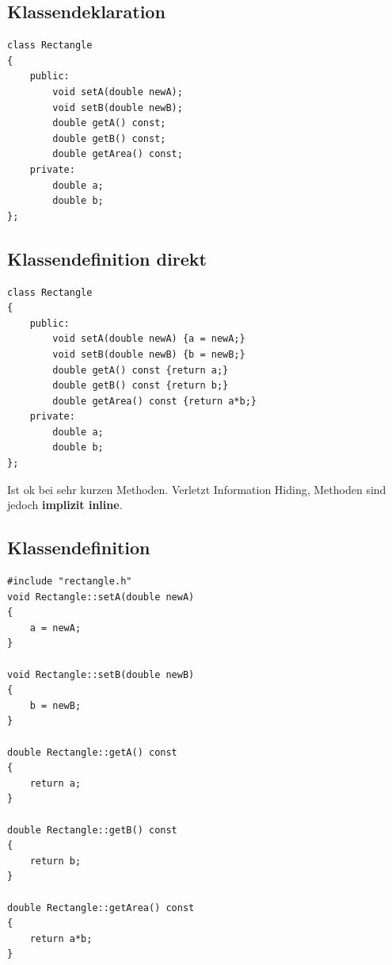 \begin{multicols}{2}
\subsection{Klassendeklaration}
\begin{minipage}{\linewidth}
\vspace{-\baselineskip}
\begin{lstlisting}
class Rectangle
{
	public:
		void setA(double newA);
		void setB(double newB);
		double getA() const;
		double getB() const;
		double getArea() const;
	private:
		double a;
		double b;
};
\end{lstlisting}
\end{minipage}

\subsection{Klassendefinition direkt}
\begin{minipage}{\linewidth}
\vspace{-\baselineskip}
\begin{lstlisting}
class Rectangle
{
	public:
		void setA(double newA) {a = newA;}
		void setB(double newB) {b = newB;}
		double getA() const {return a;}
		double getB() const {return b;}
		double getArea() const {return a*b;}
	private:
		double a;
		double b;
};
\end{lstlisting}
\end{minipage}
\begin{hinweis}
	Ist ok bei sehr kurzen Methoden. Verletzt Information Hiding, Methoden sind jedoch \textbf{implizit inline}.
\end{hinweis}

\vfill\null
\columnbreak

\subsection{Klassendefinition}
\begin{minipage}{\linewidth}
\vspace{-\baselineskip}
\begin{lstlisting}
#include "rectangle.h"
void Rectangle::setA(double newA)
{
	a = newA;
}

void Rectangle::setB(double newB)
{
	b = newB;
}

double Rectangle::getA() const
{
	return a;
}

double Rectangle::getB() const
{
	return b;
}

double Rectangle::getArea() const
{
	return a*b;
}
\end{lstlisting}	
\end{minipage}
\end{multicols}

